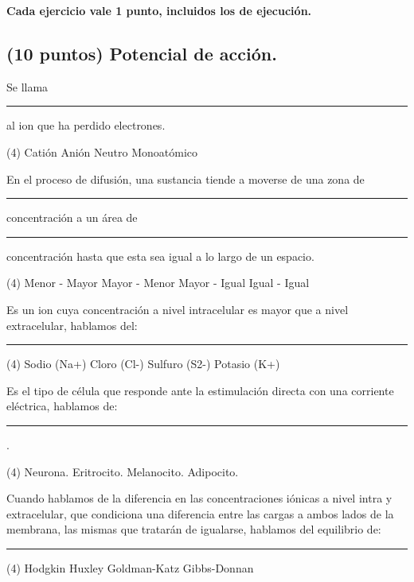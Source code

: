 \documentclass[12pt, letter]{exam}
\begin{document}

\setcounter{page}{3}

\newpage
\begin{center}
\textbf{Cada ejercicio vale 1 punto, incluidos los de ejecución.}
\end{center}

\begin{questions}

    \section{(10 puntos) Potencial de acción.}

    \question Se llama \rule{2cm}{0.1mm} al ion que ha perdido electrones.
    \begin{tasks}(4)
        \task Catión
        \task Anión
        \task Neutro
        \task Monoatómico        
    \end{tasks}
    \question En el proceso de difusión, una sustancia tiende a moverse de una zona de \rule{2cm}{0.1mm} concentración a un área de \rule{2cm}{0.1mm} concentración hasta que esta sea igual a lo largo de un espacio.
    \begin{tasks}(4)
        \task Menor - Mayor
        \task Mayor - Menor
        \task Mayor - Igual
        \task Igual - Igual
    \end{tasks}
    \question Es un ion cuya concentración a nivel intracelular es mayor que a nivel extracelular, hablamos del: \rule{2cm}{0.1mm}
    \begin{tasks}(4)
        \task Sodio (Na+)
        \task Cloro (Cl-)
        \task Sulfuro (S2-)
        \task Potasio (K+)
    \end{tasks}
    \question Es el tipo de célula que responde ante la estimulación directa con una corriente eléctrica, hablamos de: \rule{2cm}{0.1mm}.
    \begin{tasks}(4)
        \task Neurona.
        \task Eritrocito.
        \task Melanocito.
        \task Adipocito.
    \end{tasks}
    \question Cuando hablamos de la diferencia en las concentraciones iónicas a nivel intra y extracelular, que condiciona una diferencia entre las cargas a ambos lados de la membrana, las mismas que tratarán de igualarse, hablamos del equilibrio de: \rule{2cm}{0.1mm}
    \begin{tasks}(4)
        \task Hodgkin
        \task Huxley
        \task Goldman-Katz
        \task Gibbs-Donnan
    \end{tasks}

\end{questions}
\end{document}
